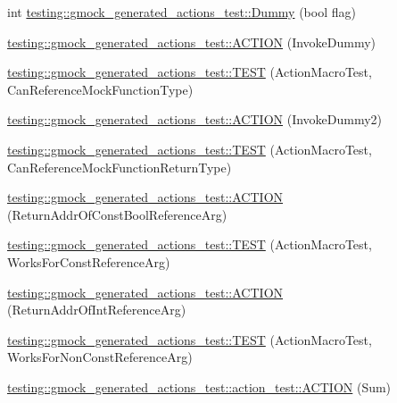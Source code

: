 \begin{DoxyCompactItemize}
int \mbox{\hyperlink{namespacetesting_1_1gmock__generated__actions__test_ab91824b86c842e024337b6de45eb8cdc}{testing\+::gmock\+\_\+generated\+\_\+actions\+\_\+test\+::\+Dummy}} (bool flag)
\item 
\mbox{\hyperlink{namespacetesting_1_1gmock__generated__actions__test_ae6806220035fcf097362dd736db4b03b}{testing\+::gmock\+\_\+generated\+\_\+actions\+\_\+test\+::\+A\+C\+T\+I\+ON}} (Invoke\+Dummy)
\item 
\mbox{\hyperlink{namespacetesting_1_1gmock__generated__actions__test_a1d3b8bb25c79d7e2167234f87935ea1e}{testing\+::gmock\+\_\+generated\+\_\+actions\+\_\+test\+::\+T\+E\+ST}} (Action\+Macro\+Test, Can\+Reference\+Mock\+Function\+Type)
\item 
\mbox{\hyperlink{namespacetesting_1_1gmock__generated__actions__test_a9f274ffcf4211cb03b4390cb0cc1ef1c}{testing\+::gmock\+\_\+generated\+\_\+actions\+\_\+test\+::\+A\+C\+T\+I\+ON}} (Invoke\+Dummy2)
\item 
\mbox{\hyperlink{namespacetesting_1_1gmock__generated__actions__test_a384a114235b474bb4318754e0d16f559}{testing\+::gmock\+\_\+generated\+\_\+actions\+\_\+test\+::\+T\+E\+ST}} (Action\+Macro\+Test, Can\+Reference\+Mock\+Function\+Return\+Type)
\item 
\mbox{\hyperlink{namespacetesting_1_1gmock__generated__actions__test_a78725817afcd5d7f19df2bdc2d41b9db}{testing\+::gmock\+\_\+generated\+\_\+actions\+\_\+test\+::\+A\+C\+T\+I\+ON}} (Return\+Addr\+Of\+Const\+Bool\+Reference\+Arg)
\item 
\mbox{\hyperlink{namespacetesting_1_1gmock__generated__actions__test_a8b4dadfc32c71e754d6ba3daae382715}{testing\+::gmock\+\_\+generated\+\_\+actions\+\_\+test\+::\+T\+E\+ST}} (Action\+Macro\+Test, Works\+For\+Const\+Reference\+Arg)
\item 
\mbox{\hyperlink{namespacetesting_1_1gmock__generated__actions__test_aeb01205293078272696bd0c19ce4e848}{testing\+::gmock\+\_\+generated\+\_\+actions\+\_\+test\+::\+A\+C\+T\+I\+ON}} (Return\+Addr\+Of\+Int\+Reference\+Arg)
\item 
\mbox{\hyperlink{namespacetesting_1_1gmock__generated__actions__test_a093a824ac7e8ec775a8f5d7b11d223a9}{testing\+::gmock\+\_\+generated\+\_\+actions\+\_\+test\+::\+T\+E\+ST}} (Action\+Macro\+Test, Works\+For\+Non\+Const\+Reference\+Arg)
\item 
\mbox{\hyperlink{namespacetesting_1_1gmock__generated__actions__test_1_1action__test_a78d00ea4fff98d5cd3f73f8f03800bbe}{testing\+::gmock\+\_\+generated\+\_\+actions\+\_\+test\+::action\+\_\+test\+::\+A\+C\+T\+I\+ON}} (Sum)

\end{DoxyCompactItemize}
